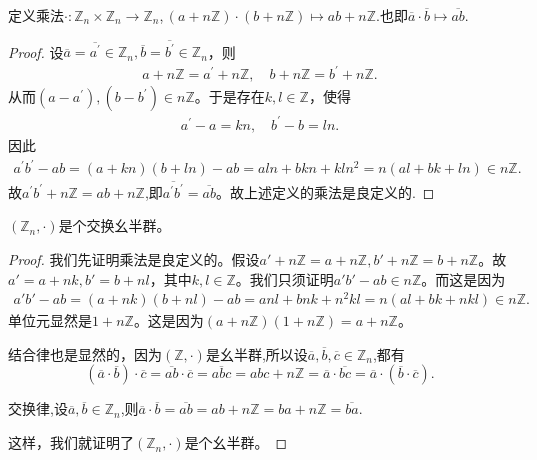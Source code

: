 \documentclass[../../main.tex]{subfiles}
\begin{document}
\begin{definition}
定义乘法$\cdot: \mathbb{Z}_n \times \mathbb{Z}_n \to \mathbb{Z}_n$,$\, (a + n\mathbb{Z}) \cdot (b + n\mathbb{Z}) \mapsto ab + n\mathbb{Z}.$也即$\overline{a}\cdot \overline{b}\mapsto \overline{ab}.$
\end{definition}
\begin{proof}
设$\overline{a} = \overline{a^\prime} \in \mathbb{Z}_n, \overline{b} = \overline{b^\prime} \in \mathbb{Z}_n$，则
\begin{align*}
a + n\mathbb{Z} = a^\prime + n\mathbb{Z}, \quad b + n\mathbb{Z} = b^\prime + n\mathbb{Z}.
\end{align*}
从而$(a - a^\prime), (b - b^\prime) \in n\mathbb{Z}$。于是存在$k, l \in \mathbb{Z}$，使得
\begin{align*}
a^\prime - a = kn, \quad b^\prime - b = ln.
\end{align*}
因此
\begin{align*}
a^\prime b^\prime - ab = (a + kn)(b + ln) - ab 
= aln + bkn + kln^2 
= n(al + bk + ln) \in n\mathbb{Z}.
\end{align*}
故$a^\prime b^\prime + n\mathbb{Z} = ab + n\mathbb{Z}$,即$\overline{a^\prime b^\prime} = \overline{ab}$。故上述定义的乘法是良定义的.
\end{proof}

\begin{proposition}\label{proposition:Z_n是一个交换幺半群}
$(\mathbb{Z}_n, \cdot)$是个交换幺半群。
\end{proposition}
\begin{proof}
我们先证明乘法是良定义的。假设$a' + n\mathbb{Z} = a + n\mathbb{Z}, b' + n\mathbb{Z} = b + n\mathbb{Z}$。故$a' = a + nk, b' = b + nl$，其中$k, l \in \mathbb{Z}$。我们只须证明$a'b' - ab \in n\mathbb{Z}$。而这是因为
\begin{align*}
a'b' - ab = (a + nk)(b + nl) - ab 
= anl + bnk + n^2kl 
= n(al + bk + nkl) \in n\mathbb{Z} .
\end{align*}
单位元显然是$1 + n\mathbb{Z}$。这是因为$(a + n\mathbb{Z})(1 + n\mathbb{Z}) = a + n\mathbb{Z}$。

结合律也是显然的，因为$(\mathbb{Z}, \cdot)$是幺半群,所以设$\overline{a},\overline{b},\overline{c}\in \mathbb{Z} _n$,都有
\[
\left( \overline{a}\cdot \overline{b} \right) \cdot \overline{c}=\overline{ab}\cdot \overline{c}=\overline{abc}=abc+n\mathbb{Z} =\overline{a}\cdot \overline{bc}=\overline{a}\cdot \left( \overline{b}\cdot \overline{c} \right) .
\]

交换律,设$\overline{a},\overline{b}\in \mathbb{Z} _n$,则$\overline{a}\cdot \overline{b}=\overline{ab}=ab+n\mathbb{Z} =ba+n\mathbb{Z} =\overline{ba}.$

这样，我们就证明了$(\mathbb{Z}_n, \cdot)$是个幺半群。
\end{proof}
\end{document}
